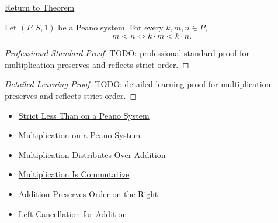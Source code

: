 \newpage
{}
\label{prf:multiplication-preserves-and-reflects-strict-order}

\begin{remark*}[Return]
\hyperref[thm:multiplication-preserves-and-reflects-strict-order]{Return to Theorem}
\end{remark*}

\begin{theorem*}
Let $(P,S,1)$ be a Peano system. For every $k,m,n \in P$,
\[
m<n
\Longleftrightarrow
k\cdot m<k\cdot n.
\]
\end{theorem*}

\begin{proof}[Professional Standard Proof]
\LRAProofBodyStart
TODO: professional standard proof for multiplication-preserves-and-reflects-strict-order.
\end{proof}

\begin{proof}[Detailed Learning Proof]
\LRAProofBodyStart
TODO: detailed learning proof for multiplication-preserves-and-reflects-strict-order.
\end{proof}

\begin{remark*}
\end{remark*}

\begin{dependencies}
\begin{itemize}
  \item \hyperref[def:strict-less-than-on-peano-system]{Strict Less Than on a Peano System}
  \item \hyperref[def:multiplication-on-peano-system]{Multiplication on a Peano System}
  \item \hyperref[thm:multiplication-distributes-over-addition]{Multiplication Distributes Over Addition}
  \item \hyperref[thm:multiplication-commutative]{Multiplication Is Commutative}
  \item \hyperref[thm:addition-preserves-order-on-right]{Addition Preserves Order on the Right}
  \item \hyperref[thm:addition-left-cancellation]{Left Cancellation for Addition}
\end{itemize}
\end{dependencies}

\clearpage
